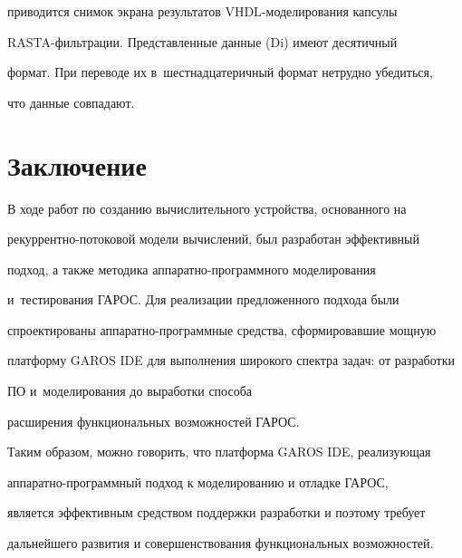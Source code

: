 приводится снимок экрана результатов VHDL-мо\-де\-ли\-ро\-ва\-ния капсулы 

RASTA-фильт\-ра\-ции. Представленные данные (Di) имеют десятичный 

формат. При переводе их в~шестнадцатеричный формат нетрудно убедиться, 

что данные совпадают.





\section{Заключение}



  В ходе работ по созданию вычислительного устройства, основанного на 

ре\-кур\-рент\-но-по\-то\-ко\-вой модели вычислений, был разработан эффективный 

подход, а также методика аппаратно-программного моделирования 

и~тестирования ГАРОС. Для реализации предложенного подхода были 

спроектированы ап\-па\-рат\-но-про\-грам\-мные средства, сформировавшие мощную 

платформу GAROS IDE для выполнения широкого спектра задач: от разработки 

ПО и~моделирования до выработки способа 

расширения функциональных возможностей ГАРОС.

  

  Таким образом, можно говорить, что платформа GAROS IDE, реализующая 

 ап\-па\-рат\-но-про\-грам\-мный подход к моделированию и отладке ГАРОС, 

является эффективным средством поддержки разработки и поэтому требует 

дальнейшего развития и совершенствования функциональных возможностей.

  



